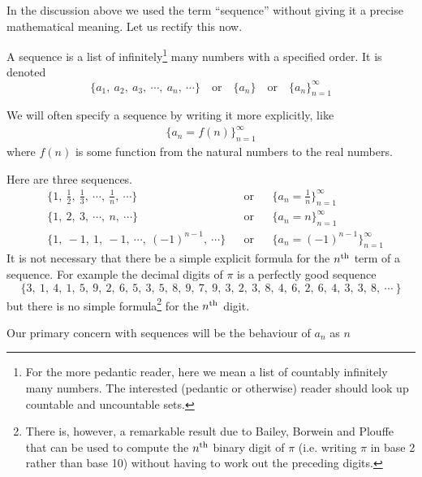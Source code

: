 In the discussion above we used the term ``sequence'' without giving
it a precise mathematical meaning. Let us rectify this now.
\begin{defn}\label{def:SRsequence}
A sequence is a list of infinitely\footnote{For the more pedantic reader,
here we mean a list of countably infinitely many numbers. The interested (pedantic or otherwise) reader should look up countable and uncountable sets.}
many numbers with a specified order.
It is denoted
\begin{equation*}
\big\{a_1,\ a_2,\ a_3,\  \cdots,\ a_n,\ \cdots\big\}
\quad\text{or}\quad
\big\{a_n\big\}
\quad\text{or}\quad
\big\{a_n\big\}_{n=1}^\infty
\end{equation*}
\end{defn}
\noindent We will often specify a sequence by writing it more explicitly, like
\begin{align*}
\Big\{ a_n = f(n) \Big\}_{n=1}^\infty
\end{align*}
where $f(n)$ is some function from the natural numbers to the real numbers.
\begin{eg}\label{eg:SRsequence}
Here are three sequences.
\begin{align*}
&\Big\{1,\ \frac{1}{2},\ \frac{1}{3},\ \cdots,\ \frac{1}{n},\ \cdots\Big\}
&&\text{or}
&&\Big\{a_n=\frac{1}{n}\Big\}_{n=1}^\infty \\[0.1in]
&\Big\{1,\ 2,\ 3,\ \cdots,\ n,\ \cdots\Big\}
&&\text{or}
&&\Big\{a_n=n\Big\}_{n=1}^\infty \\[0.1in]
&\Big\{1,\ -1,\ 1,\ -1,\ \cdots,\ (-1)^{n-1},\ \cdots\Big\}
&&\text{or}
&&\Big\{a_n=(-1)^{n-1}\Big\}_{n=1}^\infty
\end{align*}
It is not necessary that there be a simple explicit formula for the
$n^{\rm th}$ term of a sequence. For example the decimal digits of
$\pi$ is a perfectly good sequence
\begin{equation*}
\big\{3,\ 1,\ 4,\ 1,\ 5,\ 9,\ 2,\ 6,\ 5,\ 3,\ 5,\ 8,\ 9,\ 7,\ 9,\ 3,\ 2,\ 3,\
8,\ 4,\ 6,\ 2,\ 6,\ 4,\ 3,\ 3,\ 8,\ \cdots\ \big\}
\end{equation*}
but there is no simple formula\footnote{There is, however, a remarkable
result due to Bailey, Borwein and Plouffe that can be used to compute
the $n^{\rm th}$ binary digit of $\pi$ (i.e. writing $\pi$ in base 2 rather
than base 10) without having to work out the preceding digits.} for the $n^{\rm th}$ digit.

\end{eg}
Our primary concern with sequences will be the behaviour of $a_n$ as $n$
